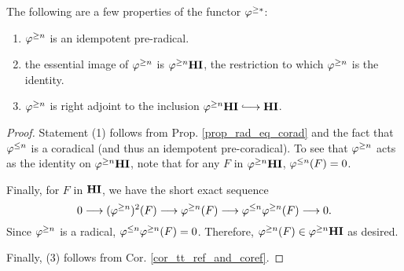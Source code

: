 The following are a few properties of the functor $\varphi^{\geq *}$:

\begin{prop}\label{prop_tgHI_reflection}
\begin{enumerate}
\item $\varphi^{\geq n}$ is an idempotent pre-radical.
\tinyskip

\item the essential image of $\varphi^{\geq n}$ is $\varphi^{\geq n}\mathbf{HI}$, the 
restriction to which $\varphi^{\geq n}$ is the identity.
\tinyskip

\item $\varphi^{\geq n}$ is right adjoint to the inclusion $\THI{n} \into 
\HI$.
\tinyskip
\end{enumerate}
\end{prop}
\begin{proof}
Statement (1) follows from Prop. \ref{prop_rad_eq_corad} and
the fact that $\varphi^{\leq n}$ is a coradical (and thus an idempotent 
pre-coradical). To see that $\varphi^{\geq n}$ acts as the identity on 
$\varphi^{\geq n}\mathbf{HI}$, note that for any $F$ in $\varphi^{\geq n}\mathbf{HI}$, $\varphi^{\leq n}(F) = 0$. 

Finally, for $F$ in $\mathbf{HI}$, we have the short exact sequence
\[
0 \longrightarrow (\varphi^{\geq n})^2(F) \longrightarrow \varphi^{\geq n}(F) \longrightarrow \varphi^{\leq n} \varphi^{\geq n}(F) 
\longrightarrow 0.
\]
Since $\varphi^{\geq n}$ is a radical, $\varphi^{\leq n} \varphi^{\geq n}(F) = 0$. 
Therefore, $\varphi^{\geq n}(F) \in \varphi^{\geq n}\mathbf{HI}$ as desired.

Finally, (3) follows from Cor. \ref{cor_tt_ref_and_coref}.
\end{proof}

